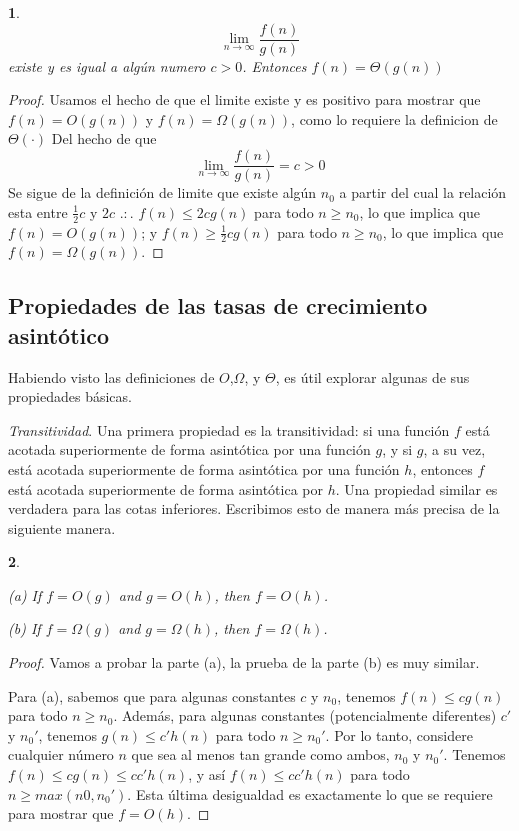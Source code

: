 \documentclass[a4paper, 12pt]{book}
\newtheorem{theorem}{}%
\begin{document}
\begin{theorem}
%
$$\lim_{n \to \infty} \frac{f(n)}{g(n)}$$
%
existe y es igual a algún numero $c > 0$. Entonces $f(n) =  \Theta(g(n))$
\end{theorem}
%
\begin{proof}
Usamos el hecho de que el limite existe y es positivo para mostrar que $f(n) = O(g(n))$ y $f(n) = \Omega(g(n))$, como lo requiere la definicion de $\Theta(\cdot)$
%
Del hecho de que
%
$$\lim_{n \to \infty} \frac{f(n)}{g(n)} = c > 0$$
%
Se sigue de la definición de limite que existe algún $n_0$ a partir del cual la relación esta entre $\frac{1}{2}c$ y $2c$ $.:.$ $f(n) \leq 2c g(n)$ para todo $n \geq n_0$, lo que implica que $f(n) = O(g(n))$; y $f(n) \geq \frac{1}{2}c g(n)$ para todo $n \geq n_0$, lo que implica que $f(n) = \Omega(g(n))$.
%
\end{proof}


\subsection*{Propiedades de las tasas de crecimiento asintótico}

Habiendo visto las definiciones de $O$,$\Omega$, y $\Theta$, es útil explorar algunas de sus propiedades básicas.

\textit{Transitividad}. Una primera propiedad es la transitividad: si una función $f$ está acotada superiormente de forma asintótica por una función $g$, y si $g$, a su vez, está acotada superiormente de forma asintótica por una función $h$, entonces $f$ está acotada superiormente de forma asintótica por $h$. Una propiedad similar es verdadera para las cotas inferiores. Escribimos esto de manera más precisa de la siguiente manera.

\begin{theorem}
\label{thm:transitive}
{\hspace{12pt}}

(a) If \(f=O(g)\) and \(g=O(h)\), then \(f=O(h)\).

(b) If \(f=\Omega(g)\) and \(g=\Omega(h)\), then \(f=\Omega(h)\).
\end{theorem}

\begin{proof}
Vamos a probar la parte (a), la prueba de la parte (b) es muy similar. 

Para (a), sabemos que para algunas constantes $c$ y $n_0$, tenemos $f(n) \leq cg(n)$ para todo $n \geq n_0$. Además, para algunas constantes (potencialmente diferentes) $c'$ y $n_0'$, tenemos $g(n) \leq c'h(n)$ para todo $n \geq n_0'$. Por lo tanto, considere cualquier número $n$ que sea al menos tan grande como ambos, $n_0$ y $n_0'$. Tenemos $f(n) \leq cg(n) \leq cc'h(n)$, y así $f(n) \leq cc'h(n)$ para todo $n \geq max(n0, n_0')$. Esta última desigualdad es exactamente lo que se requiere para mostrar que $f=O(h)$.
\end{proof}
\end{document}
